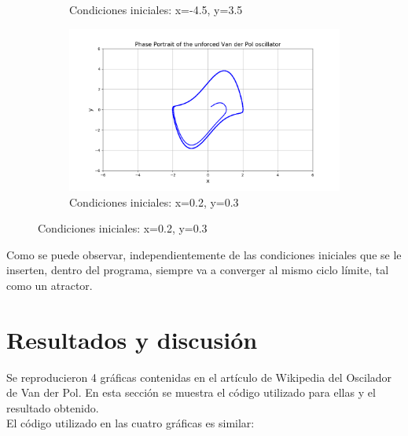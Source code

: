 \documentclass[12pt]{article}
\begin{document}
\begin{figure}[h!]
\begin{subfigure}{.55\textwidth}
\caption{Condiciones iniciales: x=-4.5, y=3.5}
\end{subfigure}
\begin{subfigure}{.55\textwidth}
\centering
\includegraphics[width=1\linewidth]{CI4.png}
\caption{Condiciones iniciales: x=0.2, y=0.3}
\end{subfigure}
\end{figure}

Como se puede observar, independientemente de las condiciones iniciales que se le inserten, dentro del programa, siempre va a converger al mismo ciclo límite, tal como un atractor. 


\section{Resultados y discusión}

Se reproducieron 4 gráficas contenidas en el artículo de Wikipedia del Oscilador de Van der Pol. En esta sección se muestra el código utilizado para ellas y el resultado obtenido. \\

El código utilizado en las cuatro gráficas es similar:
\end{document}
